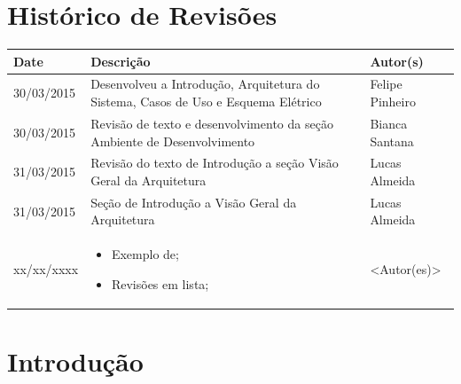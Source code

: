 \documentclass{report}
\begin{document}
\capa
%

\chapter*{Histórico de Revisões}
  \vspace*{1cm}
  \begin{table}[ht]
    \centering
    \begin{tabular}[pos]{|m{2cm} | m{8cm} | m{4cm}|} 
      \hline
      \cellcolor[gray]{0.9}
      \textbf{Date} & \cellcolor[gray]{0.9}\textbf{Descrição} & \cellcolor[gray]{0.9}\textbf{Autor(s)}\\
      \hline
      30/03/2015 &  Desenvolveu a Introdução, Arquitetura do Sistema, Casos de Uso e Esquema Elétrico & Felipe Pinheiro \\ \hline
      30/03/2015 &  Revisão de texto e desenvolvimento da seção Ambiente de Desenvolvimento & Bianca Santana \\ \hline
      31/03/2015 & Revisão do texto de Introdução a seção Visão Geral da Arquitetura & Lucas Almeida \\ \hline 
      31/03/2015 & Seção de Introdução a Visão Geral da Arquitetura & Lucas Almeida \\ \hline 
      xx/xx/xxxx &
      
      \begin{itemize}
        \item Exemplo de;
        \item Revisões em lista;
      \end{itemize}
      & <Autor(es)> \\ \hline 
    \end{tabular}
  \end{table}

\tableofcontents

\chapter{Introdução}
  
\end{document}

